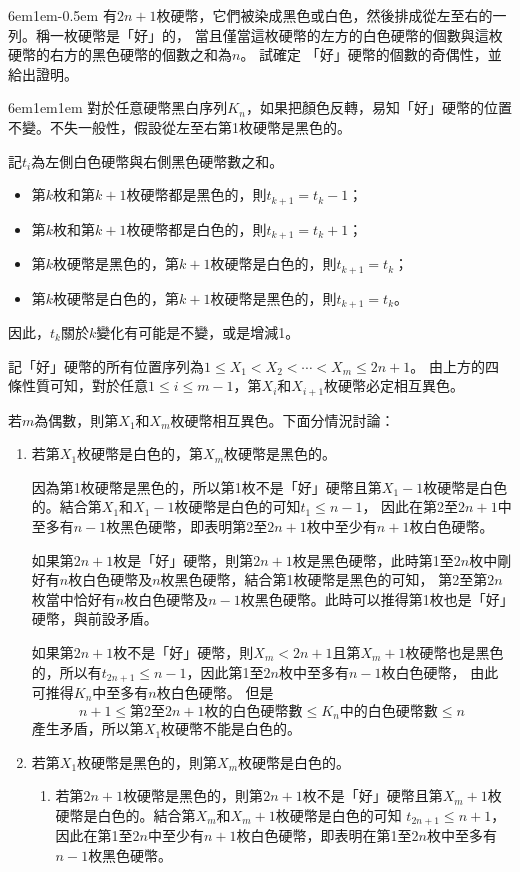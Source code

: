 \documentclass[12pt]{article}
\def\pA{-0.5em}
\def\Ap{1em}
\begin{document}
\begin{mybox}[Problem 7]{6em}{1em}{\pA}
    有$2n+1$枚硬幣，它們被染成黑色或白色，然後排成從左至右的一列。稱一枚硬幣是「好」的，
    當且僅當這枚硬幣的左方的白色硬幣的個數與這枚硬幣的右方的黑色硬幣的個數之和為$n$。
    試確定 「好」硬幣的個數的奇偶性，並給出證明。
\end{mybox}
\begin{mybox}[Answer]{6em}{1em}{\Ap}
    對於任意硬幣黑白序列$K_n$，如果把顏色反轉，易知「好」硬幣的位置不變。不失一般性，假設從左至右第1枚硬幣是黑色的。

    記$t_i$為左側白色硬幣與右側黑色硬幣數之和。
    \begin{itemize}
        \item 第$k$枚和第$k+1$枚硬幣都是黑色的，則$t_{k+1}=t_k-1$；
        \item 第$k$枚和第$k+1$枚硬幣都是白色的，則$t_{k+1}=t_k+1$；
        \item 第$k$枚硬幣是黑色的，第$k+1$枚硬幣是白色的，則$t_{k+1}=t_k$；
        \item 第$k$枚硬幣是白色的，第$k+1$枚硬幣是黑色的，則$t_{k+1}=t_k$。
    \end{itemize}
    因此，$t_k$關於$k$變化有可能是不變，或是增減1。

    記「好」硬幣的所有位置序列為$1\leq X_1<X_2<\cdots<X_m\leq 2n+1$。
    由上方的四條性質可知，對於任意$1\leq i\leq m-1$，第$X_i$和$X_{i+1}$枚硬幣必定相互異色。

    若$m$為偶數，則第$X_1$和$X_m$枚硬幣相互異色。下面分情況討論：
    \begin{enumerate}
        \item 若第$X_1$枚硬幣是白色的，第$X_m$枚硬幣是黑色的。
        
        因為第1枚硬幣是黑色的，所以第1枚不是「好」硬幣且第$X_1-1$枚硬幣是白色的。結合第$X_1$和$X_1-1$枚硬幣是白色的可知$t_1\leq n-1$，
        因此在第2至$2n+1$中至多有$n-1$枚黑色硬幣，即表明第2至$2n+1$枚中至少有$n+1$枚白色硬幣。
    
        如果第$2n+1$枚是「好」硬幣，則第$2n+1$枚是黑色硬幣，此時第1至$2n$枚中剛好有$n$枚白色硬幣及$n$枚黑色硬幣，結合第1枚硬幣是黑色的可知，
        第2至第$2n$枚當中恰好有$n$枚白色硬幣及$n-1$枚黑色硬幣。此時可以推得第1枚也是「好」硬幣，與前設矛盾。

        如果第$2n+1$枚不是「好」硬幣，則$X_m<2n+1$且第$X_m+1$枚硬幣也是黑色的，所以有$t_{2n+1}\leq n-1$，因此第1至$2n$枚中至多有$n-1$枚白色硬幣，
        由此可推得$K_n$中至多有$n$枚白色硬幣。
        但是
        $$
        n+1\leq\text{第2至$2n+1$枚的白色硬幣數}\leq\text{$K_n$中的白色硬幣數}\leq n
        $$
        產生矛盾，所以第$X_1$枚硬幣不能是白色的。
        \item 若第$X_1$枚硬幣是黑色的，則第$X_m$枚硬幣是白色的。
        \begin{enumerate}
            \item 若第$2n+1$枚硬幣是黑色的，則第$2n+1$枚不是「好」硬幣且第$X_m+1$枚硬幣是白色的。結合第$X_m$和$X_m+1$枚硬幣是白色的可知
            $t_{2n+1}\leq n+1$，因此在第1至$2n$中至少有$n+1$枚白色硬幣，即表明在第1至$2n$枚中至多有$n-1$枚黑色硬幣。


\end{enumerate}
\end{enumerate}
\end{mybox}
\end{document}
